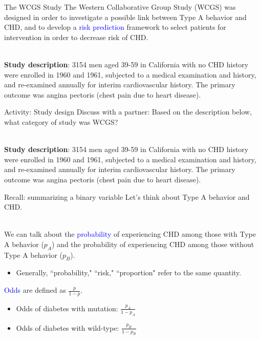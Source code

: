 \documentclass{beamer}
\begin{document}
\begin{frame}{The WCGS Study}
	The Western Collaborative Group Study (WCGS) was designed in order to investigate a possible link between Type A behavior and CHD, and to develop a \textcolor{blue}{risk prediction} framework to select patients for intervention in order to decrease risk of CHD. 
	\\ ~\ 
	
	\textbf{Study description}: 3154 men aged 39-59 in California with no CHD history were enrolled in 1960 and 1961, subjected to a medical examination and history, and re-examined annually for interim cardiovascular history. The primary outcome was angina pectoris (chest pain due to heart disease). 
\end{frame}

\begin{frame}{Activity: Study design}
	Discuss with a partner: Based on the description below, what category of study was WCGS?
	\\ ~\
	
	\textbf{Study description}: 3154 men aged 39-59 in California with no CHD history were enrolled in 1960 and 1961, subjected to a medical examination and history, and re-examined annually for interim cardiovascular history. The primary outcome was angina pectoris (chest pain due to heart disease). 
\end{frame}

\begin{frame}{Recall: summarizing a binary variable}
	Let's think about Type A behavior  and CHD. 
	\\ ~\ 
	
	We can talk about the \textcolor{blue}{probability} of experiencing CHD among those with Type A behavior ($p_A$) and the probability of experiencing CHD among those without Type A behavior ($p_B$).
	\begin{itemize}
		\item Generally, ``probability," ``risk," ``proportion" refer to the same quantity.
	\end{itemize}
	\textcolor{blue}{Odds} are defined as $\frac{p}{1-p}$.
	\begin{itemize}
		\item Odds of diabetes with mutation: $\frac{p_A}{1-p_A}$
		\item Odds of diabetes with wild-type: $\frac{p_B}{1-p_B}$
	\end{itemize}
\end{frame}
\end{document}
